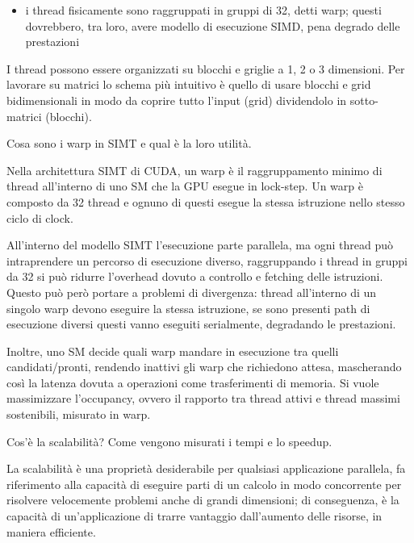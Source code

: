 \begin{questions}
\begin{solution}
\begin{itemize}
    		\item i thread fisicamente sono raggruppati in gruppi di 32, detti warp; questi dovrebbero, tra loro, avere modello di esecuzione SIMD, pena degrado delle prestazioni 
    	\end{itemize}
        
        I thread possono essere organizzati su blocchi e griglie a 1, 2 o 3 dimensioni. Per lavorare su matrici lo schema più intuitivo è quello di usare blocchi e grid bidimensionali in modo da coprire tutto l'input (grid) dividendolo in sotto-matrici (blocchi).
    \end{solution}
    
    \question Cosa sono i warp in SIMT e qual è la loro utilità.
    
    \begin{solution}
    	Nella architettura SIMT di CUDA, un warp è il raggruppamento minimo di thread all'interno di uno SM che la GPU esegue in lock-step. Un warp è composto da 32 thread e ognuno di questi esegue la stessa istruzione nello stesso ciclo di clock. 
    	
    	All'interno del modello SIMT l'esecuzione parte parallela, ma ogni thread può intraprendere un percorso di esecuzione diverso, raggruppando i thread in gruppi da 32 si può ridurre l'overhead dovuto a controllo e fetching delle istruzioni. Questo può però portare a problemi di divergenza: thread all'interno di un singolo warp devono eseguire la stessa istruzione, se sono presenti path di esecuzione diversi questi vanno eseguiti serialmente, degradando le prestazioni.
    	
    	Inoltre, uno SM decide quali warp mandare in esecuzione tra quelli candidati/pronti, rendendo inattivi gli warp che richiedono attesa, mascherando così la latenza dovuta a operazioni come trasferimenti di memoria. Si vuole massimizzare l'occupancy, ovvero il rapporto tra thread attivi e thread massimi sostenibili, misurato in warp. 
    \end{solution}
    
    \question Cos'è la scalabilità? Come vengono misurati i tempi e lo speedup.
    
    \begin{solution}
    	La scalabilità è una proprietà desiderabile per qualsiasi applicazione parallela, fa riferimento alla capacità di eseguire parti di un calcolo in modo concorrente per risolvere velocemente problemi anche di grandi dimensioni; di conseguenza, è la capacità di un'applicazione di trarre vantaggio dall'aumento delle risorse, in maniera efficiente.
    	

\end{solution}
\end{questions}
